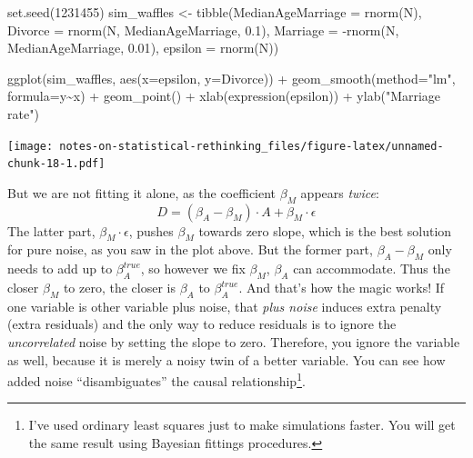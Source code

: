 \documentclass[
]{book}
\newenvironment{Shaded}{\begin{snugshade}}{\end{snugshade}}
\newcommand{\AttributeTok}[1]{\textcolor[rgb]{0.77,0.63,0.00}{#1}}
\newcommand{\DecValTok}[1]{\textcolor[rgb]{0.00,0.00,0.81}{#1}}
\newcommand{\FloatTok}[1]{\textcolor[rgb]{0.00,0.00,0.81}{#1}}
\newcommand{\FunctionTok}[1]{\textcolor[rgb]{0.00,0.00,0.00}{#1}}
\newcommand{\NormalTok}[1]{#1}
\newcommand{\OtherTok}[1]{\textcolor[rgb]{0.56,0.35,0.01}{#1}}
\newcommand{\SpecialCharTok}[1]{\textcolor[rgb]{0.00,0.00,0.00}{#1}}
\newcommand{\StringTok}[1]{\textcolor[rgb]{0.31,0.60,0.02}{#1}}
\begin{document}
\begin{Shaded}
\begin{Highlighting}[]
\FunctionTok{set.seed}\NormalTok{(}\DecValTok{1231455}\NormalTok{)}
\NormalTok{sim\_waffles }\OtherTok{\textless{}{-}} \FunctionTok{tibble}\NormalTok{(}\AttributeTok{MedianAgeMarriage =} \FunctionTok{rnorm}\NormalTok{(N),}
                      \AttributeTok{Divorce =} \FunctionTok{rnorm}\NormalTok{(N, MedianAgeMarriage, }\FloatTok{0.1}\NormalTok{),}
                      \AttributeTok{Marriage =} \SpecialCharTok{{-}}\FunctionTok{rnorm}\NormalTok{(N, MedianAgeMarriage, }\FloatTok{0.01}\NormalTok{),}
                      \AttributeTok{epsilon =} \FunctionTok{rnorm}\NormalTok{(N))}

\FunctionTok{ggplot}\NormalTok{(sim\_waffles, }\FunctionTok{aes}\NormalTok{(}\AttributeTok{x=}\NormalTok{epsilon, }\AttributeTok{y=}\NormalTok{Divorce)) }\SpecialCharTok{+} 
  \FunctionTok{geom\_smooth}\NormalTok{(}\AttributeTok{method=}\StringTok{"lm"}\NormalTok{, }\AttributeTok{formula=}\NormalTok{y}\SpecialCharTok{\textasciitilde{}}\NormalTok{x) }\SpecialCharTok{+} 
  \FunctionTok{geom\_point}\NormalTok{() }\SpecialCharTok{+} 
  \FunctionTok{xlab}\NormalTok{(}\FunctionTok{expression}\NormalTok{(epsilon)) }\SpecialCharTok{+} 
  \FunctionTok{ylab}\NormalTok{(}\StringTok{"Marriage rate"}\NormalTok{)}
\end{Highlighting}
\end{Shaded}

\texttt{[image: notes-on-statistical-rethinking\_files/figure-latex/unnamed-chunk-18-1.pdf]}

But we are not fitting it alone, as the coefficient \(\beta_M\) appears \emph{twice}:
\[D = (\beta_A  - \beta_M) \cdot A + \beta_M \cdot \epsilon\]
The latter part, \(\beta_M \cdot \epsilon\), pushes \(\beta_M\) towards zero slope, which is the best solution for pure noise, as you saw in the plot above. But the former part, \(\beta_A - \beta_M\) only needs to add up to \(\beta_A^{true}\), so however we fix \(\beta_M\), \(\beta_A\) can accommodate. Thus the closer \(\beta_M\) to zero, the closer is \(\beta_A\) to \(\beta_A^{true}\). And that's how the magic works! If one variable is other variable plus noise, that \emph{plus noise} induces extra penalty (extra residuals) and the only way to reduce residuals is to ignore the \emph{uncorrelated} noise by setting the slope to zero. Therefore, you ignore the variable as well, because it is merely a noisy twin of a better variable. You can see how added noise ``disambiguates'' the causal relationship\footnote{I've used ordinary least squares just to make simulations faster. You will get the same result using Bayesian fittings procedures.}.
\end{document}
